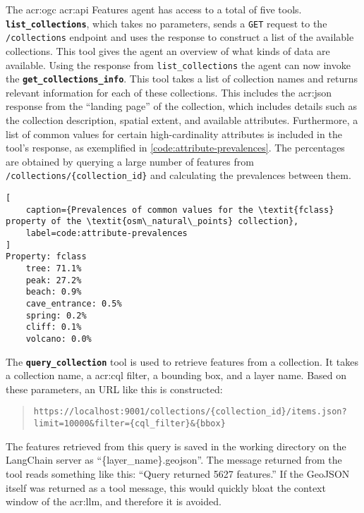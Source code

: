 The \acrshort{acr:ogc} \acrshort{acr:api} Features agent has access to a total of five tools. \textbf{\texttt{list\_collections}}, which takes no parameters, sends a \texttt{GET} request to the \texttt{/collections} endpoint and uses the response to construct a list of the available collections. This tool gives the agent an overview of what kinds of data are available. Using the response from \texttt{list\_collections} the agent can now invoke the \textbf{\texttt{get\_collections\_info}}. This tool takes a list of collection names and returns relevant information for each of these collections. This includes the \acrshort{acr:json} response from the \enquote{landing page} of the collection, which includes details such as the collection description, spatial extent, and available attributes. Furthermore, a list of common values for certain high-cardinality attributes is included in the tool's response, as exemplified in \autoref{code:attribute-prevalences}. The percentages are obtained by querying a large number of features from \texttt{/collections/\{collection\_id\}} and calculating the prevalences between them.

\begin{lstlisting}[
    caption={Prevalences of common values for the \textit{fclass} property of the \textit{osm\_natural\_points} collection},
    label=code:attribute-prevalences
]
Property: fclass
    tree: 71.1%
    peak: 27.2%
    beach: 0.9%
    cave_entrance: 0.5%
    spring: 0.2%
    cliff: 0.1%
    volcano: 0.0%
\end{lstlisting}

The \textbf{\texttt{query\_collection}} tool is used to retrieve features from a collection. It takes a collection name, a \acrshort{acr:cql} filter, a bounding box, and a layer name. Based on these parameters, an URL like this is constructed:

\begin{quote}
    \texttt{https://localhost:9001/collections/\{collection\_id\}/items.json?limit=10000\&filter=\{cql\_filter\}\&\{bbox\}}
\end{quote}

The features retrieved from this query is saved in the working directory on the LangChain server as \enquote{\{layer\_name\}.geojson}. The message returned from the tool reads something like this: \enquote{Query returned 5627 features.} If the GeoJSON itself was returned as a tool message, this would quickly bloat the context window of the \acrshort{acr:llm}, and therefore it is avoided.

